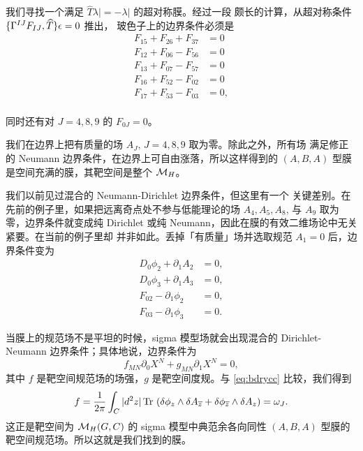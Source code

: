 我们寻找一个满足 $\hat T\lambda|=-\lambda|$ 的超对称膜。经过一段
颇长的计算，从超对称条件 $\{{\Gamma}^{IJ}F_{IJ},\widehat T\}\epsilon=0$ 推出，
玻色子上的边界条件必须是
\setcounter{equation}{30}
\begin{equation}\label{eq:tomgo}
\begin{aligned}F_{15}+F_{26}+F_{37}& = 0 \\
                    F_{12}+F_{06}-F_{56}& = 0 \\
                    F_{13}+F_{07}-F_{57}& = 0 \\
                    F_{16}+F_{52}-F_{02}& = 0 \\
                    F_{17}+F_{53}-F_{03}& = 0 ,\\\end{aligned}
\end{equation}

同时还有对 $J=4,8,9$ 的 $F_{0J}=0$。

我们在边界上把有质量的场 $A_J,\,J=4,8,9$ 取为零。除此之外，所有场
满足修正的 Neumann 边界条件，在边界上可自由涨落，所以这样得到的
$(A,B,A)$ 型膜是空间充满的膜，其靶空间是整个 ${{{\mathcal{M}}}_H}$。

我们以前见过混合的 Neumann-Dirichlet 边界条件，但这里有一个
关键差别。在先前的例子里，如果把远离奇点处不参与低能理论的场
$A_4,A_5,A_8$, 与 $A_9$ 取为零，边界条件就变成纯 Dirichlet 或纯
Neumann，因此在膜的有效二维场论中无关紧要。在当前的例子里却
并非如此。丢掉「有质量」场并选取规范 $A_1=0$ 后，边界条件变为 %
\setcounter{equation}{31}
\begin{equation}\label{eq:bdrycc}
\begin{aligned}
D_0\phi_2+\partial_1 A_2&=0,\\ D_0\phi_3+\partial_1 A_3&=0,\\
F_{02}-\partial_1\phi_2&=0,\\ F_{03}-\partial_1\phi_3&=0.\end{aligned}
\end{equation}

当膜上的规范场不是平坦的时候，sigma 模型场就会出现混合的
Dirichlet-Neumann 边界条件；具体地说，边界条件为 %
\setcounter{equation}{32}
\begin{equation}\label{eq:zembro}
f_{MN}\partial_0 X^N+g_{MN}\partial_1 X^N=0,
\end{equation}
 其中 $f$ 是靶空间规范场的场强，$g$ 是靶空间度规。与
\eqref{eq:bdrycc} 比较，我们得到 %
\setcounter{equation}{33}
\begin{equation}\label{eq:membro}
f={1\over 2\pi}\int_C |d^2z| \operatorname{Tr}\, \left(\delta \phi_z\wedge\delta
A_{\overline z}+\delta\phi_{\overline z}\wedge \delta A_z\right)=\omega_J.
\end{equation}
 这正是靶空间为 ${{{\mathcal{M}}}_H}(G,C)$ 的 sigma 模型中典范余各向同性
$(A,B,A)$ 型膜的靶空间规范场。所以这就是我们找到的膜。


